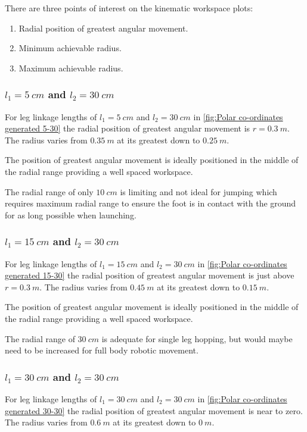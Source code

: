 There are three points of interest on the kinematic workspace plots:
\begin{enumerate}
\item Radial position of greatest angular movement.
\item Minimum achievable radius.
\item Maximum achievable radius.
\end{enumerate}

\subsubsection{$l_1=5\ cm$ and $l_2=30\ cm$}
For leg linkage lengths of $l_1=5\ cm$ and $l_2=30\ cm$ in \cref{fig:Polar co-ordinates generated 5-30} the radial position of greatest angular movement is $r=0.3\ m$. The radius varies from $0.35\ m$ at its greatest down to $0.25\ m$. 

The position of greatest angular movement is ideally positioned in the middle of the radial range providing a well spaced workspace. 

The radial range of only $10\ cm$ is limiting and not ideal for jumping which requires maximum radial range to ensure the foot is in contact with the ground for as long possible when launching.

\subsubsection{$l_1=15\ cm$ and $l_2=30\ cm$}
For leg linkage lengths of $l_1=15\ cm$ and $l_2=30\ cm$ in \cref{fig:Polar co-ordinates generated 15-30} the radial position of greatest angular movement is just above $r=0.3\ m$. The radius varies from $0.45\ m$ at its greatest down to $0.15\ m$. 

The position of greatest angular movement is ideally positioned in the middle of the radial range providing a well spaced workspace. 

The radial range of $30\ cm$ is adequate for single leg hopping, but would maybe need to be increased for full body robotic movement.

\subsubsection{$l_1=30\ cm$ and $l_2=30\ cm$}
For leg linkage lengths of $l_1=30\ cm$ and $l_2=30\ cm$ in \cref{fig:Polar co-ordinates generated 30-30} the radial position of greatest angular movement is near to zero. The radius varies from $0.6\ m$ at its greatest down to $0\ m$. 

